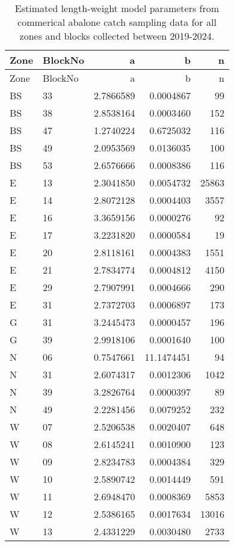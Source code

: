 \documentclass[
  11pt,
]{article}
\begin{document}
\begin{longtable}[]{@{}llrrr@{}}
\caption{Estimated length-weight model parameters from commerical
abalone catch sampling data for all zones and blocks collected between
2019-2024.}\tabularnewline
\toprule\noalign{}
Zone & BlockNo & a & b & n \\
\midrule\noalign{}
\endfirsthead
\toprule\noalign{}
Zone & BlockNo & a & b & n \\
\midrule\noalign{}
\endhead
\bottomrule\noalign{}
\endlastfoot
BS & 33 & 2.7866589 & 0.0004867 & 99 \\
BS & 38 & 2.8538164 & 0.0003460 & 152 \\
BS & 47 & 1.2740224 & 0.6725032 & 116 \\
BS & 49 & 2.0953569 & 0.0136035 & 100 \\
BS & 53 & 2.6576666 & 0.0008386 & 116 \\
E & 13 & 2.3041850 & 0.0054732 & 25863 \\
E & 14 & 2.8072128 & 0.0004403 & 3557 \\
E & 16 & 3.3659156 & 0.0000276 & 92 \\
E & 17 & 3.2231820 & 0.0000584 & 19 \\
E & 20 & 2.8118161 & 0.0004383 & 1551 \\
E & 21 & 2.7834774 & 0.0004812 & 4150 \\
E & 29 & 2.7907991 & 0.0004666 & 290 \\
E & 31 & 2.7372703 & 0.0006897 & 173 \\
G & 31 & 3.2445473 & 0.0000457 & 196 \\
G & 39 & 2.9918106 & 0.0001640 & 100 \\
N & 06 & 0.7547661 & 11.1474451 & 94 \\
N & 31 & 2.6074317 & 0.0012306 & 1042 \\
N & 39 & 3.2826764 & 0.0000397 & 89 \\
N & 49 & 2.2281456 & 0.0079252 & 232 \\
W & 07 & 2.5206538 & 0.0020407 & 648 \\
W & 08 & 2.6145241 & 0.0010900 & 123 \\
W & 09 & 2.8234783 & 0.0004384 & 329 \\
W & 10 & 2.5890742 & 0.0014449 & 591 \\
W & 11 & 2.6948470 & 0.0008369 & 5853 \\
W & 12 & 2.5386165 & 0.0017634 & 13016 \\
W & 13 & 2.4331229 & 0.0030480 & 2733 \\
\end{longtable}
\end{document}

